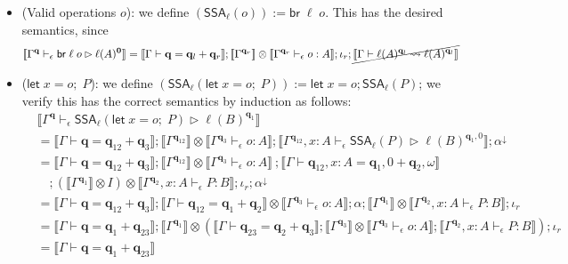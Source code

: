 \documentclass[acmsmall,screen,review]{acmart}
\newcommand{\mb}[1]{\ensuremath{\mathbf{#1}}}
\newcommand{\ms}[1]{\ensuremath{\mathsf{#1}}}
\newcommand{\letexpr}[3]{\ensuremath{\ms{let}\;#1 = #2;\;#3}}
\newcommand{\letstmt}[3]{\ensuremath{\ms{let}\;#1 = #2; #3}}
\newcommand{\brb}[2]{\ms{br}\;#1\;#2}
\newcommand{\qsp}[4]{#1 \vdash #2 = #3 + #4}
\newcommand{\lwk}[3]{#1 \vdash #2 \rightsquigarrow #3}
\newcommand{\hasty}[4]{#1 \vdash_{#2} #3: {#4}}
\newcommand{\haslb}[4]{#1 \vdash_{#2} #3 \rhd #4}
\newcommand{\tossa}[2]{\ms{SSA}_{#1}(#2)}
\newcommand{\dnt}[1]{\llbracket{#1}\rrbracket}
\begin{document}
\begin{itemize}
  \item (Valid operations $o$): we define
  $(\tossa{\ell}{o}) := \brb{\ell}{o}$. This has the desired semantics, since
  \begin{align*}
    \dnt{\haslb{\Gamma^{\mb{q}}}{\epsilon}{\brb{\ell}{o}}{\ell(A)^{\mb{0}}}}
    & = \dnt{\qsp{\Gamma}{\mb{q}}{\mb{q}_l}{\mb{q}_r}} 
      ; \dnt{\Gamma^{\mb{q}_r}} \otimes \dnt{\hasty{\Gamma^{\mb{q}_r}}{\epsilon}{o}{A}} 
      ; \iota_r
      ; \cancel{\dnt{\lwk{\Gamma}{\ell(A)^{\mb{q}_l}}{\ell(A)^{\mb{q}_l}}}}
  \end{align*}
  \item ($\letexpr{x}{o}{P}$): we define
  $(\tossa{\ell}{\letexpr{x}{o}{P}}) := \letstmt{x}{o}{\tossa{\ell}{P}}$; we verify this has
  the correct semantics by induction as follows:
  \begin{align*}
  & \dnt{\haslb{\Gamma^{\mb{q}}}{\epsilon}{\tossa{\ell}{\letexpr{x}{o}{P}}}{\ell(B)^{\mb{q}_1}}} \\
  & = \dnt{\qsp{\Gamma}{\mb{q}}{\mb{q}_{12}}{\mb{q}_3}} 
    ; \dnt{\Gamma^{\mb{q}_{12}}} \otimes \dnt{\hasty{\Gamma^{\mb{q}_3}}{\epsilon}{o}{A}}
    ; \dnt{\haslb{\Gamma^{\mb{q}_{12}}, x : A}{\epsilon}{\tossa{\ell}{P}}{\ell(B)^{\mb{q}_1, 0}}}
    ; \alpha^\downarrow \\
  & = \dnt{\qsp{\Gamma}{\mb{q}}{\mb{q}_{12}}{\mb{q}_3}} 
    ; \dnt{\Gamma^{\mb{q}_{12}}} \otimes \dnt{\hasty{\Gamma^{\mb{q}_3}}{\epsilon}{o}{A}}\
    ; \dnt{\qsp{\Gamma}{\mb{q}_{12}, x : A}{\mb{q}_1, 0}{\mb{q}_2, \omega}}
  \\ & \quad
    ; (\dnt{\Gamma^{\mb{q}_1}} \otimes I) \otimes 
      \dnt{\hasty{\Gamma^{\mb{q}_2}, x : A}{\epsilon}{P}{B}}
    ; \iota_r
    ; \alpha^\downarrow \\ 
  & = \dnt{\qsp{\Gamma}{\mb{q}}{\mb{q}_{12}}{\mb{q}_3}} 
    ; \dnt{\qsp{\Gamma}{\mb{q}_{12}}{\mb{q}_1}{\mb{q}_2}} 
      \otimes \dnt{\hasty{\Gamma^{\mb{q}_3}}{\epsilon}{o}{A}}
    ; \alpha
    ; \dnt{\Gamma^{\mb{q}_1}} \otimes \dnt{\hasty{\Gamma^{\mb{q}_2}, x : A}{\epsilon}{P}{B}}
    ; \iota_r \\
  & = \dnt{\qsp{\Gamma}{\mb{q}}{\mb{q}_1}{\mb{q}_{23}}}
    ; \dnt{\Gamma^{\mb{q}_1}} \otimes (
      \dnt{\qsp{\Gamma}{\mb{q}_{23}}{\mb{q}_2}{\mb{q}_3}}
      ; \dnt{\Gamma^{\mb{q}_{3}}} \otimes \dnt{\hasty{\Gamma^{\mb{q}_3}}{\epsilon}{o}{A}}
      ; \dnt{\hasty{\Gamma^{\mb{q}_2}, x : A}{\epsilon}{P}{B}}
    )
    ; \iota_r \\
  & = \dnt{\qsp{\Gamma}{\mb{q}}{\mb{q}_1}{\mb{q}_{23}}}

\end{align*}
\end{itemize}
\end{document}
